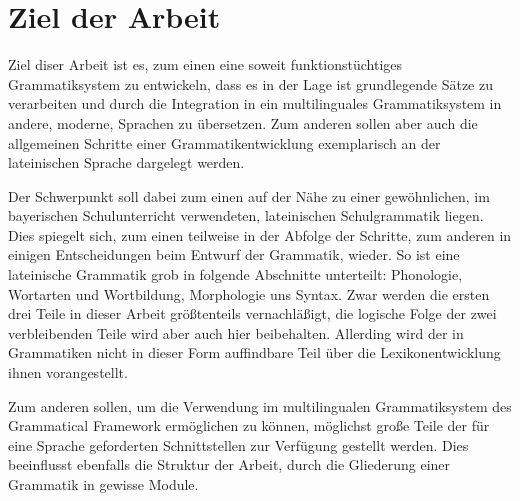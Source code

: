 \documentclass[12pt,abstract=on,titlepage,bibliography=totoc,ngerman,listof=totoc]{scrreprt}
\begin{document}
\section{Ziel der Arbeit}
\label{sec:ziel}
Ziel diser Arbeit ist es, zum einen eine soweit funktionstüchtiges Grammatiksystem zu entwickeln, dass es in der Lage ist grundlegende Sätze zu verarbeiten und durch die Integration in ein multilinguales Grammatiksystem in andere, moderne, Sprachen zu übersetzen. Zum anderen sollen aber auch die allgemeinen Schritte einer Grammatikentwicklung exemplarisch an der lateinischen Sprache dargelegt werden. \par
Der Schwerpunkt soll dabei zum einen auf der Nähe zu einer gewöhnlichen, im bayerischen Schulunterricht verwendeten, lateinischen Schulgrammatik liegen. Dies spiegelt sich, zum einen teilweise in der Abfolge der Schritte, zum anderen in einigen Entscheidungen beim Entwurf der Grammatik, wieder. So ist eine lateinische Grammatik grob in folgende Abschnitte unterteilt: Phonologie, Wortarten und Wortbildung, Morphologie uns Syntax. Zwar werden die ersten drei Teile in dieser Arbeit größtenteils vernachläßigt, die logische Folge der zwei verbleibenden Teile wird aber auch hier beibehalten. Allerding wird der in Grammatiken nicht in dieser Form auffindbare Teil über die Lexikonentwicklung ihnen vorangestellt. \par
Zum anderen sollen, um die Verwendung im multilingualen Grammatiksystem des Grammatical Framework ermöglichen zu können, möglichst große Teile der für eine Sprache geforderten Schnittstellen zur Verfügung gestellt werden. Dies beeinflusst ebenfalls die Struktur der Arbeit, durch die Gliederung einer Grammatik in gewisse Module. 
\pagebreak
\end{document}
